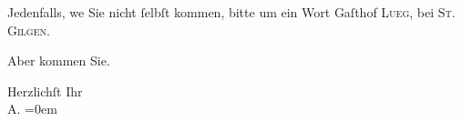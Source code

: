 \pstart
           Jedenfalls, we{\geminationn} Sie nicht{ }ſelbſt kommen, bitte um ein
               Wort Gaſthof \textsc{Lueg}, bei \textsc{St. Gilgen}.\pend
           
\pstart
           Aber kommen Sie.\pend
           
\pstart
           Herzlichſt Ihr{\\[\baselineskip]}\spacefill\mbox{A.}\pend
           \leftskip=0em{}\endnumbering{}  \newcommand{\dateiname}{L01435}\newcommand{\titel}{Arthur Schnitzler an Richard Beer-Hofmann, 3. 9. 1904}\newcommand{\editorInnen}{Martin Anton Müller und Gerd-Hermann Susen}
